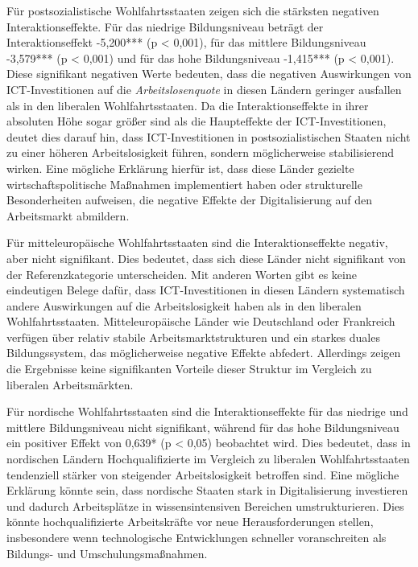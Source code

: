 Für postsozialistische Wohlfahrtsstaaten zeigen sich die stärksten negativen 
Interaktionseffekte. Für das niedrige Bildungsniveau beträgt der Interaktionseffekt 
-5,200*** (p < 0,001), für das mittlere Bildungsniveau -3,579*** (p < 0,001) und für 
das hohe Bildungsniveau -1,415*** (p < 0,001). Diese signifikant negativen Werte 
bedeuten, dass die negativen Auswirkungen von \ac{ICT}-Investitionen auf die 
\textit{Arbeitslosenquote} in diesen Ländern geringer ausfallen als in den liberalen 
Wohlfahrtsstaaten. Da die Interaktionseffekte in ihrer absoluten Höhe sogar größer 
sind als die Haupteffekte der \ac{ICT}-Investitionen, deutet dies darauf hin, dass 
\ac{ICT}-Investitionen in postsozialistischen Staaten nicht zu einer höheren 
Arbeitslosigkeit führen, sondern möglicherweise stabilisierend wirken. Eine 
mögliche Erklärung hierfür ist, dass diese Länder gezielte wirtschaftspolitische 
Maßnahmen implementiert haben oder strukturelle Besonderheiten aufweisen, die 
negative Effekte der Digitalisierung auf den Arbeitsmarkt abmildern.

Für mitteleuropäische Wohlfahrtsstaaten sind die Interaktionseffekte negativ, aber 
nicht signifikant. Dies bedeutet, dass sich diese Länder nicht signifikant von der 
Referenzkategorie unterscheiden. Mit anderen Worten gibt es keine eindeutigen Belege 
dafür, dass \ac{ICT}-Investitionen in diesen Ländern systematisch andere Auswirkungen 
auf die Arbeitslosigkeit haben als in den liberalen Wohlfahrtsstaaten. 
Mitteleuropäische Länder wie Deutschland oder Frankreich verfügen über relativ stabile 
Arbeitsmarktstrukturen und ein starkes duales Bildungssystem, das möglicherweise 
negative Effekte abfedert. Allerdings zeigen die Ergebnisse keine signifikanten 
Vorteile dieser Struktur im Vergleich zu liberalen Arbeitsmärkten.

Für nordische Wohlfahrtsstaaten sind die Interaktionseffekte für das niedrige und 
mittlere Bildungsniveau nicht signifikant, während für das hohe Bildungsniveau ein 
positiver Effekt von 0,639* (p < 0,05) beobachtet wird. Dies bedeutet, dass in 
nordischen Ländern Hochqualifizierte im Vergleich zu liberalen Wohlfahrtsstaaten 
tendenziell stärker von steigender Arbeitslosigkeit betroffen sind. Eine mögliche 
Erklärung könnte sein, dass nordische Staaten stark in Digitalisierung investieren 
und dadurch Arbeitsplätze in wissensintensiven Bereichen umstrukturieren. Dies 
könnte hochqualifizierte Arbeitskräfte vor neue Herausforderungen stellen, 
insbesondere wenn technologische Entwicklungen schneller voranschreiten als 
Bildungs- und Umschulungsmaßnahmen.

